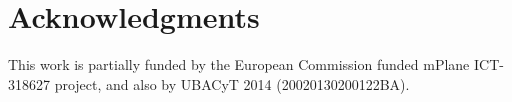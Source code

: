 \section*{Acknowledgments}\label{ack}
This work is partially funded by the European Commission funded mPlane
ICT-318627 project, and also by UBACyT 2014 (20020130200122BA).
